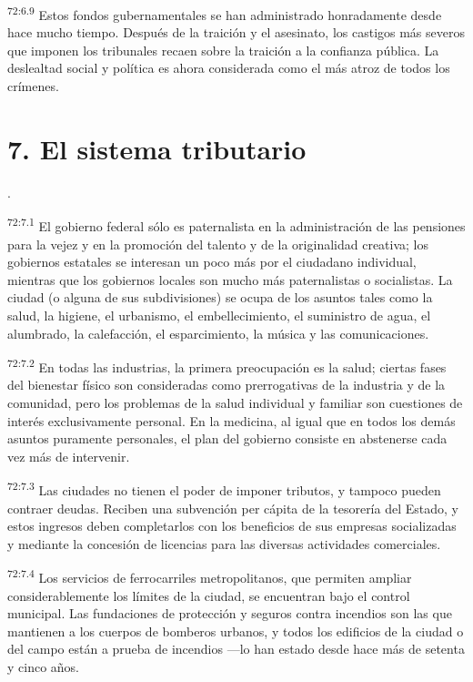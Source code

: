 \documentclass[twoside, 11pt]{book}
\begin{document}
\par
\textsuperscript{72:6.9} Estos fondos gubernamentales se han administrado honradamente desde hace mucho tiempo. Después de la traición y el asesinato, los castigos más severos que imponen los tribunales recaen sobre la traición a la confianza pública. La deslealtad social y política es ahora considerada como el más atroz de todos los crímenes.

\section*{7. El sistema tributario}.
\par
\textsuperscript{72:7.1} El gobierno federal sólo es paternalista en la administración de las pensiones para la vejez y en la promoción del talento y de la originalidad creativa; los gobiernos estatales se interesan un poco más por el ciudadano individual, mientras que los gobiernos locales son mucho más paternalistas o socialistas. La ciudad (o alguna de sus subdivisiones) se ocupa de los asuntos tales como la salud, la higiene, el urbanismo, el embellecimiento, el suministro de agua, el alumbrado, la calefacción, el esparcimiento, la música y las comunicaciones.

\par
\textsuperscript{72:7.2} En todas las industrias, la primera preocupación es la salud; ciertas fases del bienestar físico son consideradas como prerrogativas de la industria y de la comunidad, pero los problemas de la salud individual y familiar son cuestiones de interés exclusivamente personal. En la medicina, al igual que en todos los demás asuntos puramente personales, el plan del gobierno consiste en abstenerse cada vez más de intervenir.

\par
\textsuperscript{72:7.3} Las ciudades no tienen el poder de imponer tributos, y tampoco pueden contraer deudas. Reciben una subvención per cápita de la tesorería del Estado, y estos ingresos deben completarlos con los beneficios de sus empresas socializadas y mediante la concesión de licencias para las diversas actividades comerciales.

\par
\textsuperscript{72:7.4} Los servicios de ferrocarriles metropolitanos, que permiten ampliar considerablemente los límites de la ciudad, se encuentran bajo el control municipal. Las fundaciones de protección y seguros contra incendios son las que mantienen a los cuerpos de bomberos urbanos, y todos los edificios de la ciudad o del campo están a prueba de incendios ---lo han estado desde hace más de setenta y cinco años.
\end{document}
